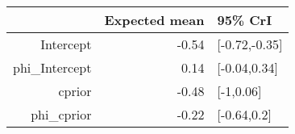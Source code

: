 \begin{tabular}{rrl}
  \hline
 & Expected mean & 95\% CrI \\ 
  \hline
Intercept & -0.54 & [-0.72,-0.35] \\ 
  phi\_Intercept & 0.14 & [-0.04,0.34] \\ 
  cprior & -0.48 & [-1,0.06] \\ 
  phi\_cprior & -0.22 & [-0.64,0.2] \\ 
   \hline
\end{tabular}

